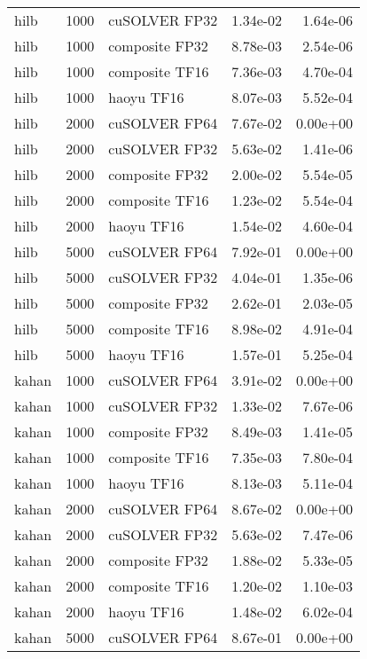 \begin{table}
\begin{tabular}{lrlrr}
     hilb &  1000 &  cuSOLVER FP32 &  1.34e-02 &        1.64e-06 \\
     hilb &  1000 & composite FP32 &  8.78e-03 &        2.54e-06 \\
     hilb &  1000 & composite TF16 &  7.36e-03 &        4.70e-04 \\
     hilb &  1000 &     haoyu TF16 &  8.07e-03 &        5.52e-04 \\
     hilb &  2000 &  cuSOLVER FP64 &  7.67e-02 &        0.00e+00 \\
     hilb &  2000 &  cuSOLVER FP32 &  5.63e-02 &        1.41e-06 \\
     hilb &  2000 & composite FP32 &  2.00e-02 &        5.54e-05 \\
     hilb &  2000 & composite TF16 &  1.23e-02 &        5.54e-04 \\
     hilb &  2000 &     haoyu TF16 &  1.54e-02 &        4.60e-04 \\
     hilb &  5000 &  cuSOLVER FP64 &  7.92e-01 &        0.00e+00 \\
     hilb &  5000 &  cuSOLVER FP32 &  4.04e-01 &        1.35e-06 \\
     hilb &  5000 & composite FP32 &  2.62e-01 &        2.03e-05 \\
     hilb &  5000 & composite TF16 &  8.98e-02 &        4.91e-04 \\
     hilb &  5000 &     haoyu TF16 &  1.57e-01 &        5.25e-04 \\
    kahan &  1000 &  cuSOLVER FP64 &  3.91e-02 &        0.00e+00 \\
    kahan &  1000 &  cuSOLVER FP32 &  1.33e-02 &        7.67e-06 \\
    kahan &  1000 & composite FP32 &  8.49e-03 &        1.41e-05 \\
    kahan &  1000 & composite TF16 &  7.35e-03 &        7.80e-04 \\
    kahan &  1000 &     haoyu TF16 &  8.13e-03 &        5.11e-04 \\
    kahan &  2000 &  cuSOLVER FP64 &  8.67e-02 &        0.00e+00 \\
    kahan &  2000 &  cuSOLVER FP32 &  5.63e-02 &        7.47e-06 \\
    kahan &  2000 & composite FP32 &  1.88e-02 &        5.33e-05 \\
    kahan &  2000 & composite TF16 &  1.20e-02 &        1.10e-03 \\
    kahan &  2000 &     haoyu TF16 &  1.48e-02 &        6.02e-04 \\
    kahan &  5000 &  cuSOLVER FP64 &  8.67e-01 &        0.00e+00 \\

\end{tabular}
\end{table}
